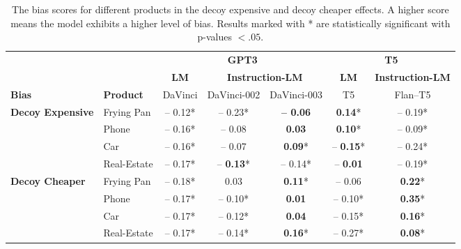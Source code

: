 \begin{table*}[th!]
\centering
\begin{tabular}{@{}llccc  cc@{}}
\toprule
 &  & \multicolumn{3}{c}{\textbf{GPT3}} & \multicolumn{2}{c}{\textbf{T5}}  \\
 \cmidrule(lr){3-5} \cmidrule(lr){6-7}
& & \textbf{LM} &  \multicolumn{2}{c}{\textbf{Instruction-LM}} & \textbf{LM} & \textbf{Instruction-LM}  \\
\cmidrule(lr){4-5}
\hspace{1.2cm} \textbf{Bias} & \hspace{0.3cm} \textbf{Product} & DaVinci & DaVinci-002 & DaVinci-003 & T5 & Flan--T5  \\
\midrule

\multirow{4}{*}{{\hspace{0.3cm} \textbf{Decoy Expensive}}} 
& Frying Pan & -- 0.12*  &  \hspace{0.1cm}  -- 0.23* & \textbf{-- 0.06} &  \hspace{0.15cm} \textbf{0.14}* &  -- 0.19*  \\
& Phone & -- 0.16* & -- 0.08 &  \hspace{0.1cm} \textbf{0.03} &  \hspace{0.15cm} \textbf{0.10}* & -- 0.09*   \\
& Car & -- 0.16* & -- 0.07  & \hspace{0.2cm} \textbf{0.09}* & -- \textbf{0.15}* &  -- 0.24*  \\
& Real-Estate & -- 0.17* & -- \textbf{0.13}*  &  \hspace{0.05cm} -- 0.14* & -- \textbf{0.01}  &  -- 0.19*  \\

\midrule

\multirow{4}{*}{{\hspace{0.2cm} \textbf{Decoy Cheaper}}} 
& Frying Pan & -- 0.18* &  \hspace{0.1cm} 0.03 &  \hspace{0.1cm} \textbf{0.11}* &  \hspace{0.1cm} -- 0.06 &  \textbf{0.22}*  \\
& Phone & -- 0.17* & -- 0.10* & \textbf{0.01}  & -- 0.10* &  \textbf{0.35}*  \\
& Car & -- 0.17* & -- 0.12*  & \textbf{0.04}  & -- 0.15*  &  \textbf{0.16}*  \\
& Real-Estate & -- 0.17* & -- 0.14* &  \hspace{0.1cm} \textbf{0.16}* &  -- 0.27* & \textbf{0.08}*   \\



\bottomrule
\end{tabular}
\caption{The bias scores for different products in the decoy expensive and decoy cheaper effects. A higher score means the model exhibits a higher level of bias. Results marked with * are statistically significant with p-values $<.05$.}
\label{appendix:tab:products_results}
\end{table*}